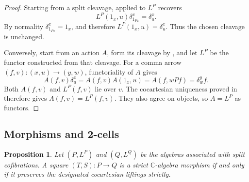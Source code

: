 \documentclass[11pt]{article}
\theoremstyle{plain}
\newtheorem{proposition}[theorem]{Proposition}
\theoremstyle{definition}
\theoremstyle{remark}
\newcommand{\C}{\mathbb{C}}
\numberwithin{equation}{section}
\begin{document}
\begin{proof}
Starting from a split cleavage,  applied to
$L^{P}$ recovers
\begin{equation*}
L^{P}(1_x,u)\delta^x_{1_{Px}}=\delta^{x}_{u}.
\end{equation*}
By normality $\delta^x_{1_{Px}}=1_x$, and therefore
$L^{P}(1_x,u)=\delta^{x}_{u}$.  Thus the chosen cleavage is unchanged.

Conversely, start from an action $A$, form its cleavage by
, and let $L^{P}$ be the functor constructed
from that cleavage.  For a comma arrow
$(f,v)\colon(x,u)\to(y,w)$, functoriality of $A$ gives
\begin{equation}
A(f,v)\delta^{x}_{u}
  =A(f,v)A(1_x,u)
  =A(f,wPf)
  =\delta^{y}_{w}f.
  \label{eq:A-characterization}
\end{equation}
Both $A(f,v)$ and $L^{P}(f,v)$ lie over $v$.  The cocartesian
uniqueness proved in  therefore
gives $A(f,v)=L^{P}(f,v)$.  They also agree on objects, so
$A=L^{P}$ as functors.
\end{proof}

\subsection{Morphisms and 2-cells}

\begin{proposition}\label{prop:one-cells}
Let $(P,L^{P})$ and $(Q,L^{Q})$ be the algebras associated with split
cofibrations.  A square $(T,S)\colon P\to Q$ is a strict
$\C$-algebra morphism if and only if it preserves the designated
cocartesian liftings strictly.
\end{proposition}
\end{document}

